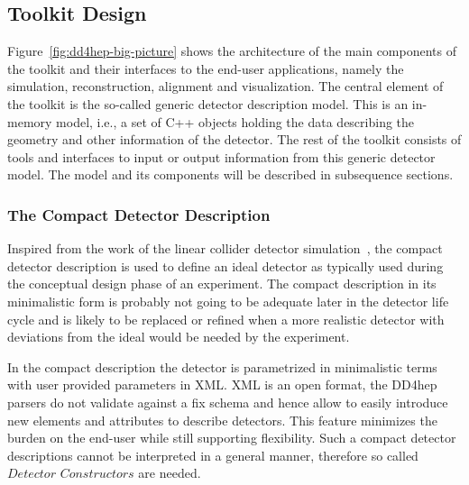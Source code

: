 \subsection{Toolkit Design}
\label{sec:toolkit-design}
\noindent
Figure~\ref{fig:dd4hep-big-picture} shows the architecture 
of the main components of the toolkit and their interfaces 
to the end-user applications, namely the simulation, reconstruction, 
alignment and visualization. 
The central element of the toolkit is the so-called generic detector 
description model. This is an in-memory model, i.e., a set of C++ objects 
holding the data describing the geometry and other information of 
the detector. The rest of the toolkit consists of tools and interfaces 
to input or output information from this generic detector model. 
The model and its components will be described in subsequence sections.

\subsubsection{The Compact Detector Description}
\label{sec:problem_analysis}
\noindent
Inspired from the work of the linear collider detector 
simulation~\cite{bib:LCDD,bib:lcsim}, the compact detector description is used
to define an ideal detector as typically used during 
the conceptual design phase of an experiment. 
The compact description in its minimalistic form is probably not going to 
be adequate later in the detector life cycle and
is likely to be replaced or refined when a more realistic detector 
with deviations from the ideal would be needed by the experiment.

\noindent
In the compact description the detector is parametrized in minimalistic terms
with user provided parameters in XML.
XML is an open format, the DD4hep parsers do not validate against a fix schema
and hence allow to easily introduce new elements and attributes to describe 
detectors. This feature minimizes the burden on the end-user while still 
supporting flexibility.
Such a compact detector descriptions cannot be interpreted in a 
general manner, therefore so called $Detector$ $Constructors$ are needed.

